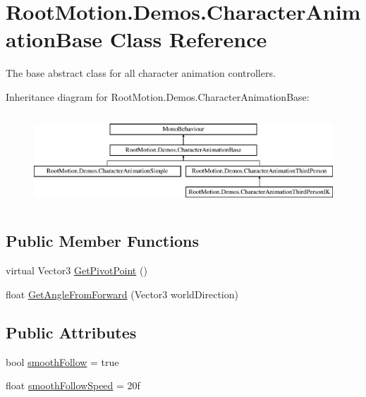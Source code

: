 \hypertarget{class_root_motion_1_1_demos_1_1_character_animation_base}{}\section{Root\+Motion.\+Demos.\+Character\+Animation\+Base Class Reference}
\label{class_root_motion_1_1_demos_1_1_character_animation_base}


The base abstract class for all character animation controllers.  


Inheritance diagram for Root\+Motion.\+Demos.\+Character\+Animation\+Base\+:\begin{figure}[H]
\begin{center}
\leavevmode
\includegraphics[height=3.489097cm]{class_root_motion_1_1_demos_1_1_character_animation_base}
\end{center}
\end{figure}
\subsection*{Public Member Functions}
\begin{DoxyCompactItemize}
\item 
virtual Vector3 \mbox{\hyperlink{class_root_motion_1_1_demos_1_1_character_animation_base_a223adef755549b4989920036a2a164cd}{Get\+Pivot\+Point}} ()
\item 
float \mbox{\hyperlink{class_root_motion_1_1_demos_1_1_character_animation_base_af31748e78dec1ece7ed77702f34e9dc9}{Get\+Angle\+From\+Forward}} (Vector3 world\+Direction)
\end{DoxyCompactItemize}
\subsection*{Public Attributes}
\begin{DoxyCompactItemize}
\item 
bool \mbox{\hyperlink{class_root_motion_1_1_demos_1_1_character_animation_base_a3783ba9a51e05162a006683c5d034168}{smooth\+Follow}} = true
\item 
float \mbox{\hyperlink{class_root_motion_1_1_demos_1_1_character_animation_base_a8c6d78811946a5caf56306d6d37390af}{smooth\+Follow\+Speed}} = 20f
\end{DoxyCompactItemize}

